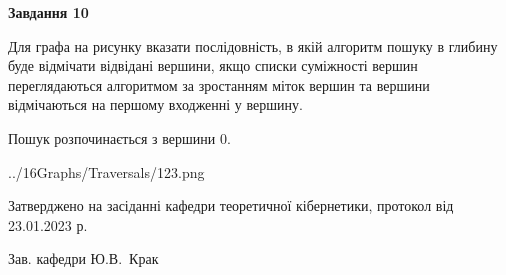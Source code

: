 \documentclass[12pt, ukrainian]{article}
\begin{document}
{\begin {large}
{\begin {center}\textbf{Завдання 10}\end {center}}\par
Для графа на рисунку вказати послідовність, в якій алгоритм пошуку в глибину буде відмічати відвідані вершини, якщо списки суміжності вершин переглядаються алгоритмом за зростанням міток вершин та вершини відмічаються на першому вход\-женні у вершину.\par
Пошук розпочинається з вершини 0.\par

\begin{center}
	{../16Graphs/Traversals/123.png}
\end{center}\par
\newpage


\end {large}
}
{\smallskip \begin {small} Затверджено на засіданні кафедри теоретичної кібернетики, протокол  від   23.01.2023 р.\par\smallskip\smallskip
{\parbox {6.5 cm}{Зав. кафедри \dotfill Ю.В.~Крак}} \end{small}}
\end{document}
